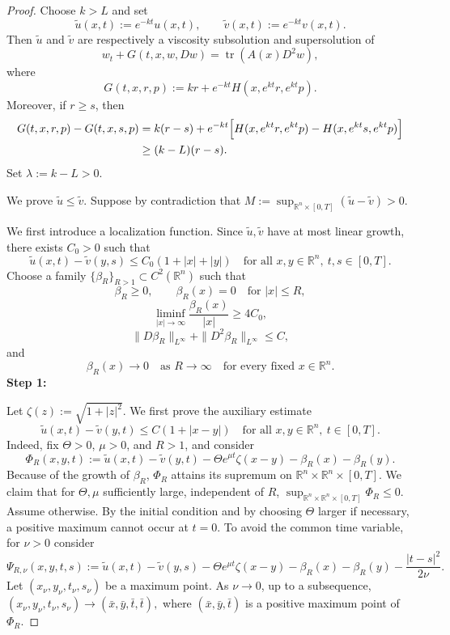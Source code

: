 \documentclass[10pt,a4paper]{amsart}
\begin{document}
\begin{proof}
Choose \(k>L\) and set
\[
 \widetilde u(x,t):=e^{-kt}u(x,t),
 \qquad
 \widetilde v(x,t):=e^{-kt}v(x,t).
\]
Then \(\widetilde u\) and \(\widetilde v\) are respectively a viscosity subsolution and supersolution of
\[
 w_t+G(t,x,w,Dw)=\operatorname{tr}(A(x)D^2w),
\]
where
\[
 G(t,x,r,p):=kr+e^{-kt}H(x,e^{kt}r,e^{kt}p).
\]
Moreover, if \(r\ge s\), then
\[
\begin{aligned}
 G(t,x,r,p)-G(t,x,s,p)
 &=
 k(r-s)+e^{-kt}
 \Bigl[
 H(x,e^{kt}r,e^{kt}p)-H(x,e^{kt}s,e^{kt}p)
 \Bigr] \\
 &\ge (k-L)(r-s).
\end{aligned}
\]
Set $ \lambda:=k-L>0.$

We prove \(\widetilde u\le \widetilde v\). Suppose by contradiction that $M:=\sup_{\mathbb R^n\times[0,T]}(\widetilde u-\widetilde v)>0.$

We first introduce a localization function. Since \(\widetilde u,\widetilde v\) have at most linear growth, there exists \(C_0>0\) such that
\[
 \widetilde u(x,t)-\widetilde v(y,s)\le C_0(1+|x|+|y|)
 \quad\text{for all }x,y\in\mathbb R^n,\ t,s\in[0,T].
\]
Choose a family \(\{\beta_R\}_{R>1}\subset C^2(\mathbb R^n)\) such that
\[
 \beta_R\ge0,\qquad
 \beta_R(x)=0\quad\text{for }|x|\le R,
\]
\[
 \liminf_{|x|\to\infty}\frac{\beta_R(x)}{|x|}\ge 4C_0,
\]
\[
 \|D\beta_R\|_{L^\infty}+\|D^2\beta_R\|_{L^\infty}\le C,
\]
and
\[
 \beta_R(x)\to0
 \quad\text{as }R\to\infty
 \quad\text{for every fixed }x\in\mathbb R^n.
\]
\textbf{Step 1:}

Let $ \zeta(z):=\sqrt{1+|z|^2}.$
We first prove the auxiliary estimate
\[
 \widetilde u(x,t)-\widetilde v(y,t)
 \le
 C(1+|x-y|)
 \quad\text{for all }x,y\in\mathbb R^n,\ t\in[0,T].
\]
Indeed, fix \(\Theta>0\), \(\mu>0\), and \(R>1\), and consider
\[
 \Phi_R(x,y,t)
 :=
 \widetilde u(x,t)-\widetilde v(y,t)
 -
 \Theta e^{\mu t}\zeta(x-y)
 -
 \beta_R(x)-\beta_R(y).
\]
Because of the growth of \(\beta_R\), \(\Phi_R\) attains its supremum on \(\mathbb R^n\times\mathbb R^n\times[0,T]\). We claim that for \(\Theta,\mu\) sufficiently large, independent of \(R\), $ \sup_{\mathbb R^n\times\mathbb R^n\times[0,T]}\Phi_R\le0.$
Assume otherwise. By the initial condition and by choosing \(\Theta\) larger if necessary, a positive maximum cannot occur at \(t=0\). To avoid the common time variable, for \(\nu>0\) consider
\[
 \Psi_{R,\nu}(x,y,t,s)
 :=
 \widetilde u(x,t)-\widetilde v(y,s)
 -
 \Theta e^{\mu t}\zeta(x-y)
 -
 \beta_R(x)-\beta_R(y)
 -
 \frac{|t-s|^2}{2\nu}.
\]
Let \((x_\nu,y_\nu,t_\nu,s_\nu)\) be a maximum point. As \(\nu\to0\), up to a subsequence, $(x_\nu,y_\nu,t_\nu,s_\nu)\to(\bar x,\bar y,\bar t,\bar t),$
where \((\bar x,\bar y,\bar t)\) is a positive maximum point of \(\Phi_R\).


\end{proof}
\end{document}
